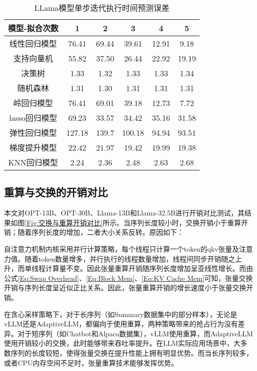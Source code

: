 \begin{table}[H]
  \centering
  \caption{LLama模型单步迭代执行时间预测误差}
  \label{Table:LLama模型单步迭代执行时间预测误差}
  \renewcommand{\arraystretch}{1.25}
  \small
  \begin{tabular}{c c c c c c}
    \toprule
    \textbf{模型-拟合次数} & \textbf{1} & \textbf{2} & \textbf{3} & \textbf{4} & \textbf{5} \\
    \midrule
    线性回归模型 & 76.41 & 69.44 & 39.61 & 12.91 & 9.18 \\ 
    支持向量机 & 55.82 & 37.50 & 26.44 & 22.92 & 19.19 \\ 
    决策树 & 1.33 & 1.32 & 1.33 & 1.33 & 1.34 \\ 
    随机森林 & 1.31 & 1.30 & 1.31 & 1.31 & 1.31 \\ 
    岭回归模型 & 76.41 & 69.01 & 39.18 & 12.73 & 7.72 \\ 
    lasso回归模型 & 69.23 & 33.57 & 34.42 & 35.16 & 31.58  \\ 
    弹性回归模型 & 127.18 & 139.7 & 100.18 & 94.94 & 93.51  \\ 
    梯度提升模型 & 22.42 & 21.97 & 19.42 & 19.99 & 19.38  \\ 
    KNN回归模型 & 2.24 & 2.36 & 2.48 & 2.63 & 2.68 \\ 
    \bottomrule
  \end{tabular}
\end{table}

\subsection{重算与交换的开销对比}

本文对OPT-13B、OPT-30B、Llama-13B和Llama-32.5B进行开销对比测试，其结果如图\ref{Fig:交换与重算开销对比}所示。当序列长度较小时，交换开销小于重算开销；随着序列长度的增加，二者大小关系反转。原因如下：  \par

自注意力机制内核采用并行计算策略，每个线程只计算一个token的qkv张量及注意力值。随着token数量增多，并行执行的线程数量增加，线程间同步开销随之上升，而单线程计算量不变。因此张量重算开销随序列长度增加呈亚线性增长。而由公式\ref{Eq:Swap Overhead}、\ref{Eq:Block Mem}、\ref{Eq:KV Cache Mem}可知，张量交换开销与序列长度呈近似正比关系。因此，张量重算开销的增长速度小于张量交换开销。  \par

在贪心采样策略下，对于长序列（如Summary数据集中的部分样本），无论是vLLM还是AdaptiveLLM，都偏向于使用重算，两种策略带来的抢占行为没有差异。对于短序列（如Chatbot和Alpaca数据集），vLLM使用重算，而AdaptiveLLM使用开销较小的交换，此时能够带来吞吐率提升。在LLM实际应用场景中，大多数序列的长度较短，使得张量交换在提升性能上拥有明显优势。而当长序列较多，或者CPU内存空间不足时，张量重算技术能够发挥优势。 

